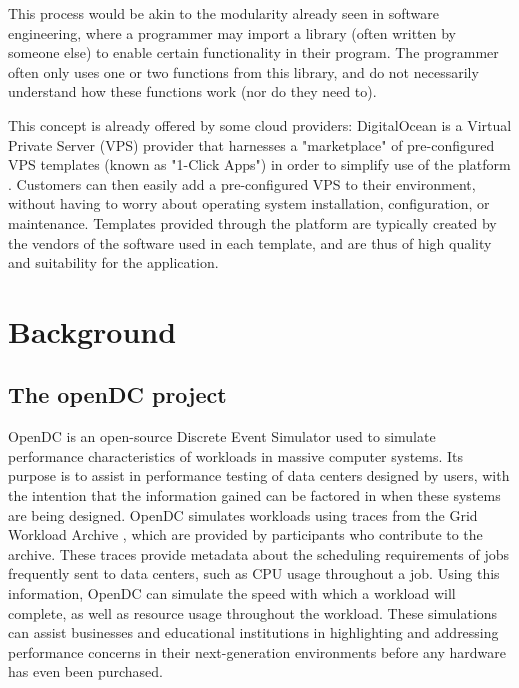 \documentclass[11pt]{article}
\begin{document}
	This process would be akin to the modularity already seen in software engineering, where a programmer may import a library (often written by someone else) to enable certain functionality in their program. 
	The programmer often only uses one or two functions from this library, and do not necessarily understand how these functions work (nor do they need to).

	This concept is already offered by some cloud providers: DigitalOcean is a Virtual Private Server (VPS) provider that harnesses a "marketplace" of pre-configured VPS templates (known as "1-Click Apps") in order to simplify use of the platform \cite{DigitalOcean2020}. 
	Customers can then easily add a pre-configured VPS to their environment, without having to worry about operating system installation, configuration, or maintenance. 
	Templates provided through the platform are typically created by the vendors of the software used in each template, and are thus of high quality and suitability for the application.

\newpage

\section{Background} \label{sec:background}

	\subsection{The openDC project}
		OpenDC is an open-source Discrete Event Simulator used to simulate performance characteristics of workloads in massive computer systems. 
		Its purpose is to assist in performance testing of data centers designed by users, with the intention that the information gained can be factored in when these systems are being designed. 
		OpenDC simulates workloads using traces from the Grid Workload Archive \cite{Iosup2008}, which are provided by participants who contribute to the archive. 
		These traces provide metadata about the scheduling requirements of jobs frequently sent to data centers, such as CPU usage throughout a job. 
		Using this information, OpenDC can simulate the speed with which a workload will complete, as well as resource usage throughout the workload. 
		These simulations can assist businesses and educational institutions in highlighting and addressing performance concerns in their next-generation environments before any hardware has even been purchased.
\end{document}
